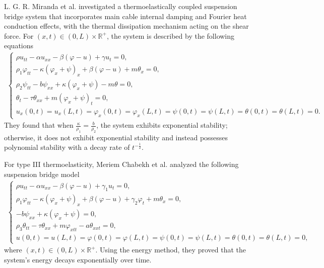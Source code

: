 \documentclass[11pt,reqno]{article}
\begin{document}
	
L. G. R. Miranda et al. \cite{MR4887867} investigated a thermoelastically coupled suspension bridge system that incorporates main cable internal damping and Fourier heat conduction effects, with the thermal dissipation mechanism acting on the shear force. For $(x,t) \in (0,L)\times \mathbb{R}^+$, the system is described by the following equations
	\begin{align}\label{eq1.3}
		\begin{cases}
			\rho u_{tt} - \alpha u_{xx} - \beta (\varphi - u) + \gamma u_t = 0,  \\
			\rho_1 \varphi_{tt} - \kappa (\varphi_x + \psi)_x + \beta(\varphi - u) + m\theta_x = 0 ,  \\
			\rho_2 \psi_{tt} - b \psi_{xx} + \kappa (\varphi_x + \psi) - m\theta = 0, \\
			\theta_t - \tau \theta_{xx} + m(\varphi_x + \psi)_t = 0,\\
			u_x(0,t)=u_x(L,t)=\varphi_x(0,t)=\varphi_x(L,t)=\psi(0,t)=\psi(L,t)=\theta(0,t)=\theta(L,t)=0.
		\end{cases}
	\end{align}
	They found that when $\frac{\kappa}{\rho_1} = \frac{b}{\rho_2}$, the system exhibits exponential stability; otherwise, it does not exhibit exponential stability and instead possesses polynomial stability with a decay rate of $t^{-\frac{1}{2}}$.

	
For type III thermoelasticity, Meriem Chabekh et al. \cite{MR4848548} analyzed the following suspension bridge model
	\begin{align*}
		\begin{cases}
			\rho u_{tt} - \alpha u_{xx} - \beta (\varphi - u) + \gamma_1 u_t = 0, \\
			\rho_1 \varphi_{tt} - \kappa (\varphi_x + \psi)_x + \beta (\varphi - u) + \gamma_2 \varphi_t + m \theta_x = 0,  \\
			-b \psi_{xx} + \kappa (\varphi_x + \psi) = 0, \\
			\rho_3 \theta_{tt} - \tau \theta_{xx} + m \varphi_{xtt} - a \theta_{xxt} = 0, \\
			u(0, t) = u(L, t) = \varphi (0, t) = \varphi (L, t) = \psi (0, t) = \psi (L, t) = \theta (0, t) = \theta (L, t) = 0,
		\end{cases}
	\end{align*}
where $(x,t) \in (0,L)\times \mathbb{R}^+$. Using the energy method, they proved that the system's energy decays exponentially over time.
	
\end{document}
